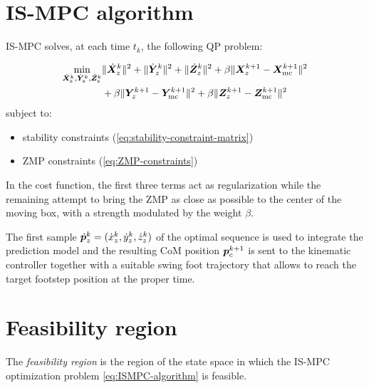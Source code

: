 \section{IS-MPC algorithm}
IS-MPC solves, at each time $t_k$, the following QP problem:
\begin{braced}
\begin{equation}
\begin{split}
\min_{\dot{\bm{X}}_\text{z}^k, \dot{\bm{Y}}_\text{z}^k, \dot{\bm{Z}}_\text{z}^k}
&\|\dot{\bm{X}}_z^k\|^2 + \|\dot{\bm{Y}}_z^k\|^2 + \|\dot{\bm{Z}}_z^k\|^2+\beta \|\bm{X}_z^{k+1} - {\bm{X}}_{\rm mc}^{k+1}\|^2 \\& + \beta \|\bm{Y}_z^{k+1} - {\bm{Y}}_{\rm mc}^{k+1}\|^2 + \beta \|\bm{Z}_z^{k+1} - {\bm{Z}}_{\rm mc}^{k+1}\|^2 \\
\end{split}
\label{eq:ISMPC-algorithm}
\end{equation}
\hspace{0.25cm} subject to:
\begin{itemize}
    \item stability constraints (\ref{eq:stability-constraint-matrix})
    \item ZMP constraints (\ref{eq:ZMP-constraints})
\end{itemize}
\end{braced}

In the cost function, the first three terms act as regularization while the
remaining attempt to bring the ZMP as close as possible to the center of the
moving box, with a strength modulated by the weight $\beta$.

The first sample $\dot {{\bm{p}}}_z^k = (\dot x_z^k, \dot y_z^k, \dot z_z^k)$ of the
optimal sequence is used to integrate the prediction model and the resulting
CoM position ${\bm{p}}_c^{k+1}$ is sent to the kinematic controller together with
a suitable swing foot trajectory that allows to reach the target footstep
position at the proper time.

\section{Feasibility region}

The {\em feasibility region} is the region of the state space in which the
IS-MPC optimization problem \eqref{eq:ISMPC-algorithm} is feasible.

